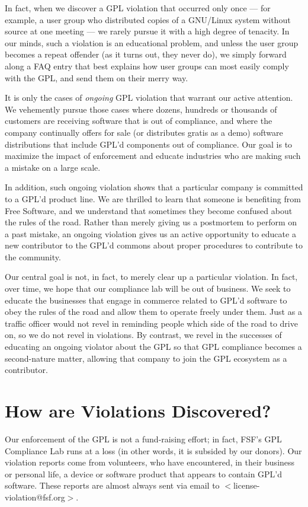 In fact, when we discover a GPL violation that occurred only once --- for
example, a user group who distributed copies of a GNU/Linux system without
source at one meeting --- we rarely pursue it with a high degree of
tenacity. In our minds, such a violation is an educational problem, and
unless the user group becomes a repeat offender (as it turns out, they
never do), we simply forward along a FAQ entry that best explains how user
groups can most easily comply with the GPL, and send them on their merry way.

It is only the cases of {\em ongoing\/} GPL violation that warrant our
active attention. We vehemently pursue those cases where dozens, hundreds
or thousands of customers are receiving software that is out of
compliance, and where the company continually offers for sale (or
distributes gratis as a demo) software distributions that include GPL'd
components out of compliance. Our goal is to maximize the impact of
enforcement and educate industries who are making such a mistake on a
large scale.

In addition, such ongoing violation shows that a particular company is
committed to a GPL'd product line. We are thrilled to learn that someone
is benefiting from Free Software, and we understand that sometimes they
become confused about the rules of the road. Rather than merely
giving us a postmortem to perform on a past mistake, an ongoing violation
gives us an active opportunity to educate a new contributor to the GPL'd
commons about proper procedures to contribute to the community.

Our central goal is not, in fact, to merely clear up a particular violation.
In fact, over time, we hope that our compliance lab will be out of
business. We seek to educate the businesses that engage in commerce
related to GPL'd software to obey the rules of the road and allow them to
operate freely under them. Just as a traffic officer would not revel in
reminding people which side of the road to drive on, so we do not revel in
violations. By contrast, we revel in the successes of educating an
ongoing violator about the GPL so that GPL compliance becomes a second-nature
matter, allowing that company to join the GPL ecosystem as a contributor.

\section{How are Violations Discovered?}

Our enforcement of the GPL is not a fund-raising effort; in fact, FSF's GPL
Compliance Lab runs at a loss (in other words, it is subsided by our
donors). Our violation reports come from volunteers, who have encountered,
in their business or personal life, a device or software product that
appears to contain GPL'd software. These reports are almost always sent
via email to $<$license-violation@fsf.org$>$.

